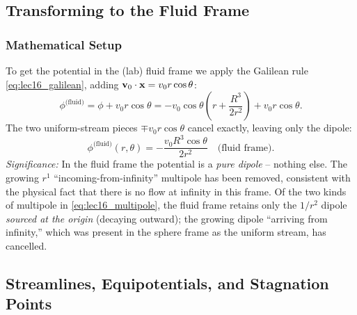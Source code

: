 \documentclass[../main.tex]{subfiles}
\begin{document}
\subsection{Transforming to the Fluid Frame}\label{sec:lec16:fluidframe}

\subsubsection*{Mathematical Setup}
To get the potential in the (lab) fluid frame we apply the Galilean rule \eqref{eq:lec16_galilean}, adding $\mathbf{v}_0\cdot\mathbf{x}=v_0 r\cos\theta$:
\begin{equation}
  \phi^{\text{(fluid)}} = \phi + v_0 r\cos\theta
  = -v_0\cos\theta\left(r + \frac{R^3}{2r^2}\right) + v_0 r\cos\theta.
  \label{eq:lec16_fluid_add}
\end{equation}
The two uniform-stream pieces $\mp v_0 r\cos\theta$ cancel exactly, leaving only the dipole:
\begin{equation}
  \boxed{\phi^{\text{(fluid)}}(r,\theta) = -\frac{v_0 R^3\cos\theta}{2r^2} \quad\text{(fluid frame)}.}
  \label{eq:lec16_phi_fluidframe}
\end{equation}
\textit{Significance:} In the fluid frame the potential is a \emph{pure dipole} -- nothing else. The growing $r^1$ ``incoming-from-infinity'' multipole has been removed, consistent with the physical fact that there is no flow at infinity in this frame. Of the two kinds of multipole in \eqref{eq:lec16_multipole}, the fluid frame retains only the $1/r^2$ dipole \emph{sourced at the origin} (decaying outward); the growing dipole ``arriving from infinity,'' which was present in the sphere frame as the uniform stream, has cancelled.


\subsection{Streamlines, Equipotentials, and Stagnation Points}\label{sec:lec16:streamlines}
\end{document}
